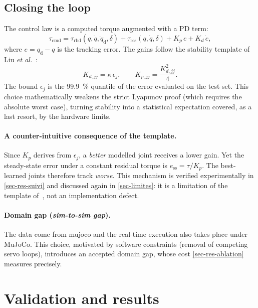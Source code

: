\documentclass[a4paper, oneside]{article}
\newcommand{\q}{\ensuremath{q}}
\newcommand{\qd}{\ensuremath{\dot{q}}}
\newcommand{\qdd}{\ensuremath{\ddot{q}}}
\newcommand{\taurbd}{\ensuremath{\tau_{\mathrm{rbd}}}}
\newcommand{\taures}{\ensuremath{\tau_{\mathrm{res}}}}
\newcommand{\taucmd}{\ensuremath{\tau_{\mathrm{cmd}}}}
\begin{document}
\subsection{Closing the loop}
\label{sec-boucle}

The control law is a computed torque augmented with a PD term:
%
\begin{equation}
    \taucmd = \taurbd(\q,\qd,\qdd_{\mathrm{d}},\delta) + \taures(\q,\qd,\delta)
    + K_p\,e + K_d\,\dot{e} ,
    \label{eq-ctpd}
\end{equation}
%
where $e = \q_{\mathrm{d}} - \q$ is the tracking error. The gains follow the
stability template of Liu \emph{et al.}~\cite{liu2024}:
%
\begin{equation}
    K_{d,jj} = \kappa\,\epsilon_j , \qquad K_{p,jj} = \frac{K_{d,jj}^{2}}{4} .
    \label{eq-gains}
\end{equation}
%
The bound $\epsilon_j$ is the \SI{99.9}{\percent} quantile of the error
evaluated on the test set. This choice mathematically weakens the strict
Lyapunov proof (which requires the absolute worst case), turning stability into
a statistical expectation covered, as a last resort, by the hardware limits.

\paragraph{A counter-intuitive consequence of the template.} Since $K_p$ derives
from $\epsilon_j$, a \emph{better} modelled joint receives a lower gain. Yet the
steady-state error under a constant residual torque is $e_{\mathrm{ss}} =
\tau/K_p$. The best-learned joints therefore track \emph{worse}. This mechanism
is verified experimentally in \cref{sec-res-suivi} and discussed again in
\cref{sec-limites}: it is a limitation of the template of~\cite{liu2024}, not
an implementation defect.

\paragraph{Domain gap (\emph{sim-to-sim gap}).} The data come from mujoco
and the real-time execution also takes place under MuJoCo. This choice, motivated by
software constraints (removal of competing servo loops), introduces an accepted
domain gap, whose cost \cref{sec-res-ablation} measures precisely.

\section{Validation and results}
\label{sec-resultats}
\end{document}
